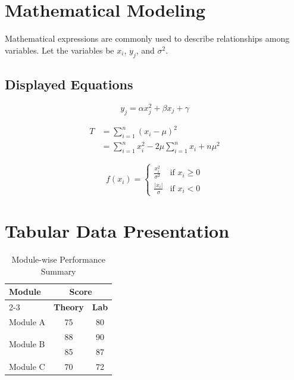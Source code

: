 \documentclass[11pt]{article}
\begin{document}
\section{Mathematical Modeling}
Mathematical expressions are commonly used to describe relationships among variables. Let the variables be $x_{i}$, $y_{j}$, and $\sigma^{2}$.

\subsection{Displayed Equations}
\begin{equation}
    y_{j}=\alpha x_{j}^{2}+\beta x_{j}+\gamma
\end{equation}

\begin{equation}
\begin{split}
    T &= \sum_{i=1}^{n}(x_{i}-\mu)^{2} \\
      &= \sum_{i=1}^{n}x_{i}^{2}-2\mu\sum_{i=1}^{n}x_{i}+n\mu^{2}
\end{split}
\end{equation}

\begin{equation}
    f(x_{i}) = \begin{cases} 
        \frac{x_{i}^{2}}{\sigma^{2}} & \text{if } x_{i} \ge 0 \\ 
        \frac{|x_{i}|}{\sigma} & \text{if } x_{i} < 0 
    \end{cases}
\end{equation}

\section{Tabular Data Presentation}

\begin{table}[h!]
    \centering
    \caption{Module-wise Performance Summary}
    \vspace{0.2cm}
    \begin{tabular}{|l|c|c|}
        \hline
        \multirow{2}{*}{\textbf{Module}} & \multicolumn{2}{c|}{\textbf{Score}} \\ \cline{2-3}
         & \textbf{Theory} & \textbf{Lab} \\ \hline
        Module A & 75 & 80 \\ \hline
        \multirow{2}{*}{Module B} & 88 & 90 \\ 
         & 85 & 87 \\ \hline
        Module C & 70 & 72 \\ \hline
    \end{tabular}
\end{table}
\end{document}
